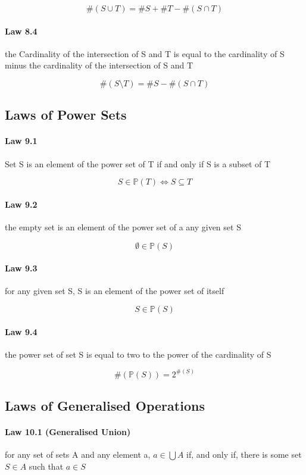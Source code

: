 \documentclass[twocolumn]{article}
\begin{document}
$$ \#(S  \cup  T) = \#S + \#T - \#(S  \cap  T) $$

\paragraph{Law 8.4} the Cardinality of the intersection of S and T is equal to the cardinality of S minus the cardinality of the intersection of S and T

$$ \#(S \setminus T) = \#S - \#(S  \cap  T) $$

\subsection{Laws of Power Sets}

\paragraph{Law 9.1} Set S is an element of the power set of T if and only if S is a subset of T

$$ S  \in  \mathbb{P} (T) \iff S  \subseteq  T $$

\paragraph{Law 9.2} the empty set is an element of the power set of a any given set S

$$  \emptyset  \in   \mathbb{P} (S) $$

\paragraph{Law 9.3} for any given set S, S is an element of the power set of itself

$$ S  \in  \mathbb{P} (S) $$

\paragraph{Law 9.4} the power set of set S is equal to two to the power of the cardinality of S

$$ \#( \mathbb{P} (S)) = 2^{\#(S)} $$

\subsection{Laws of Generalised Operations}

\paragraph{Law 10.1 (Generalised Union)} for any set of sets A and any element a, $a  \in   \bigcup  A $ if, and only if, there is some set $S  \in  A $ such that $ a  \in  S$
\end{document}

